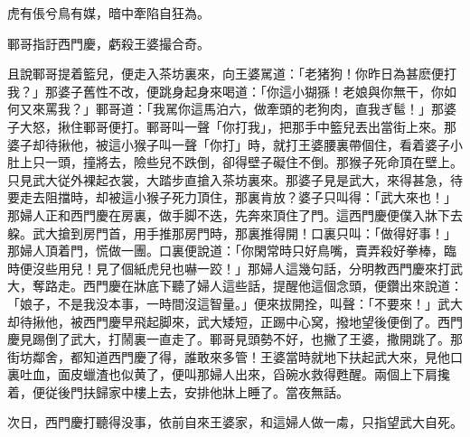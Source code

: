 \begin{myquote}
虎有倀兮鳥有媒，暗中牽陷自狂為。

鄆哥指訏西門慶，虧殺王婆撮合奇。
\end{myquote}

且說鄆哥提着籃兒，便走入茶坊裏來，向王婆駡道：「老猪狗！你昨日為甚麽便打我？」那婆子舊性不改，便跳身起身來喝道：「你這小猢猻！老娘與你無干，你如何又來罵我？」鄆哥道：「我駡你這馬泊六，做牽頭的老狗肉，直我ぎ䯲！」那婆子大怒，揪住鄆哥便打。鄆哥叫一聲「你打我」，把那手中籃兒丟出當街上來。那婆子却待揪他，被這小猴子叫一聲「你打」時，就打王婆腰裏帶個住，看着婆子小肚上只一頭，撞將去，險些兒不跌倒，卻得壁子礙住不倒。那猴子死命頂在壁上。只見武大従外裸起衣裳，大踏步直搶入茶坊裏來。那婆子見是武大，來得甚急，待要走去阻擋時，却被這小猴子死力頂住，那裏肯放？婆子只叫得：「武大來也！」那婦人正和西門慶在房裏，做手脚不迭，先奔來頂住了門。這西門慶便僕入牀下去躱。武大搶到房門首，用手推那房門時，那裏推得開！口裏只叫：「做得好事！」那婦人頂着門，慌做一團。口裏便說道：「你閑常時只好鳥嘴，賣弄殺好拳棒，臨時便沒些用兒！見了個紙虎兒也嚇一跤！」那婦人這幾句話，分明教西門慶來打武大，奪路走。西門慶在牀底下聽了婦人這些話，提醒他這個念頭，便鑽出來說道：「娘子，不是我没本事，一時間沒這智量。」便來拔開拴，叫聲：「不要來！」武大却待揪他，被西門慶早飛起脚來，武大矮短，正踢中心窝，撥地望後便倒了。西門慶見踢倒了武大，打鬧裏一直走了。鄆哥見頭勢不好，也撇了王婆，撒開跳了。那街坊鄰舍，都知道西門慶了得，誰敢來多管！王婆當時就地下扶起武大來，見他口裏吐血，面皮蠟渣也似黄了，便叫那婦人出來，舀碗水救得甦醒。兩個上下肩攙着，便従後門扶歸家中樓上去，安排他牀上睡了。當夜無話。

次日，西門慶打聽得没事，依前自來王婆家，和這婦人做一䖏，只指望武大自死。

